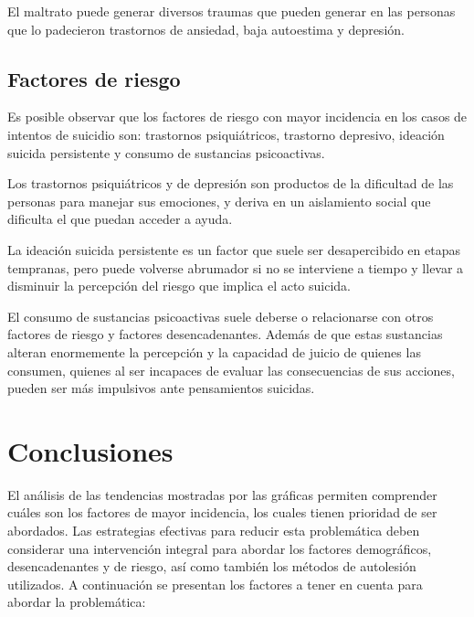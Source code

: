 \documentclass[
]{article}
\begin{document}
El maltrato puede generar diversos traumas que pueden generar en las
personas que lo padecieron trastornos de ansiedad, baja autoestima y
depresión.

\subsection{Factores de riesgo}\label{factores-de-riesgo-1}

Es posible observar que los factores de riesgo con mayor incidencia en
los casos de intentos de suicidio son: trastornos psiquiátricos,
trastorno depresivo, ideación suicida persistente y consumo de
sustancias psicoactivas.

Los trastornos psiquiátricos y de depresión son productos de la
dificultad de las personas para manejar sus emociones, y deriva en un
aislamiento social que dificulta el que puedan acceder a ayuda.

La ideación suicida persistente es un factor que suele ser desapercibido
en etapas tempranas, pero puede volverse abrumador si no se interviene a
tiempo y llevar a disminuir la percepción del riesgo que implica el acto
suicida.

El consumo de sustancias psicoactivas suele deberse o relacionarse con
otros factores de riesgo y factores desencadenantes. Además de que estas
sustancias alteran enormemente la percepción y la capacidad de juicio de
quienes las consumen, quienes al ser incapaces de evaluar las
consecuencias de sus acciones, pueden ser más impulsivos ante
pensamientos suicidas.

\section{\texorpdfstring{\textbf{Conclusiones}}{Conclusiones}}\label{conclusiones}

El análisis de las tendencias mostradas por las gráficas permiten
comprender cuáles son los factores de mayor incidencia, los cuales
tienen prioridad de ser abordados. Las estrategias efectivas para
reducir esta problemática deben considerar una intervención integral
para abordar los factores demográficos, desencadenantes y de riesgo, así
como también los métodos de autolesión utilizados. A continuación se
presentan los factores a tener en cuenta para abordar la problemática:
\end{document}
